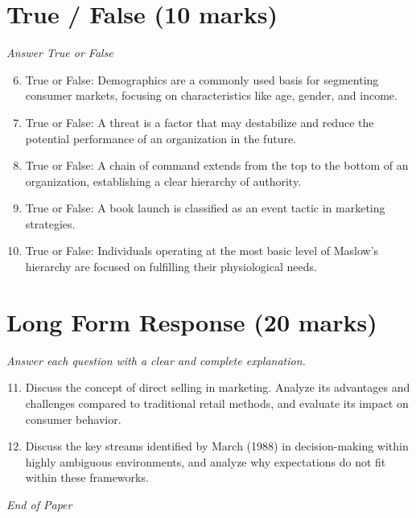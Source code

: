 \documentclass[12pt]{article}
\begin{document}
\section*{True / False (10 marks)}
\textit{Answer True or False}
\begin{enumerate}[label=\arabic*.]
\setcounter{enumi}{5}
\item True or False: Demographics are a commonly used basis for segmenting consumer markets, focusing on characteristics like age, gender, and income.
\item True or False: A threat is a factor that may destabilize and reduce the potential performance of an organization in the future.
\item True or False: A chain of command extends from the top to the bottom of an organization, establishing a clear hierarchy of authority.
\item True or False: A book launch is classified as an event tactic in marketing strategies.
\item True or False: Individuals operating at the most basic level of Maslow's hierarchy are focused on fulfilling their physiological needs.
\end{enumerate}

\section*{Long Form Response (20 marks)}
\textit{Answer each question with a clear and complete explanation.}
\begin{enumerate}[label=\arabic*.]
\setcounter{enumi}{10}
\item Discuss the concept of direct selling in marketing. Analyze its advantages and challenges compared to traditional retail methods, and evaluate its impact on consumer behavior.
\item Discuss the key streams identified by March (1988) in decision-making within highly ambiguous environments, and analyze why expectations do not fit within these frameworks.
\end{enumerate}

\vfill
\noindent\textit{End of Paper}
\end{document}
